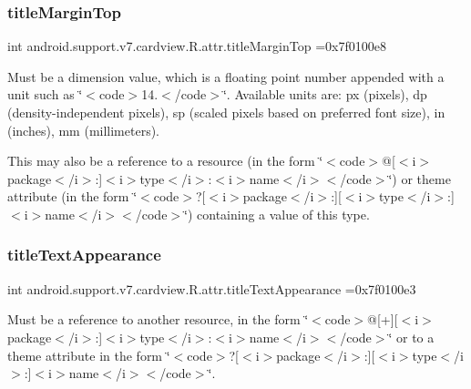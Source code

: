 \subsubsection{\texorpdfstring{title\+Margin\+Top}{titleMarginTop}}
{\footnotesize\ttfamily int android.\+support.\+v7.\+cardview.\+R.\+attr.\+title\+Margin\+Top =0x7f0100e8\hspace{0.3cm}{\ttfamily [static]}}

Must be a dimension value, which is a floating point number appended with a unit such as \char`\"{}$<$code$>$14.\+5sp$<$/code$>$\char`\"{}. Available units are\+: px (pixels), dp (density-\/independent pixels), sp (scaled pixels based on preferred font size), in (inches), mm (millimeters). 

This may also be a reference to a resource (in the form \char`\"{}$<$code$>$@\mbox{[}$<$i$>$package$<$/i$>$\+:\mbox{]}$<$i$>$type$<$/i$>$\+:$<$i$>$name$<$/i$>$$<$/code$>$\char`\"{}) or theme attribute (in the form \char`\"{}$<$code$>$?\mbox{[}$<$i$>$package$<$/i$>$\+:\mbox{]}\mbox{[}$<$i$>$type$<$/i$>$\+:\mbox{]}$<$i$>$name$<$/i$>$$<$/code$>$\char`\"{}) containing a value of this type. \mbox{\label{classandroid_1_1support_1_1v7_1_1cardview_1_1R_1_1attr_af05d7a19e10d8dc2559fa9ea74564708}} 
\subsubsection{\texorpdfstring{title\+Text\+Appearance}{titleTextAppearance}}
{\footnotesize\ttfamily int android.\+support.\+v7.\+cardview.\+R.\+attr.\+title\+Text\+Appearance =0x7f0100e3\hspace{0.3cm}{\ttfamily [static]}}

Must be a reference to another resource, in the form \char`\"{}$<$code$>$@\mbox{[}+\mbox{]}\mbox{[}$<$i$>$package$<$/i$>$\+:\mbox{]}$<$i$>$type$<$/i$>$\+:$<$i$>$name$<$/i$>$$<$/code$>$\char`\"{} or to a theme attribute in the form \char`\"{}$<$code$>$?\mbox{[}$<$i$>$package$<$/i$>$\+:\mbox{]}\mbox{[}$<$i$>$type$<$/i$>$\+:\mbox{]}$<$i$>$name$<$/i$>$$<$/code$>$\char`\"{}. \mbox{\label{classandroid_1_1support_1_1v7_1_1cardview_1_1R_1_1attr_aeb03451b46c4b9a227b1dc0d451dfd00}} 
